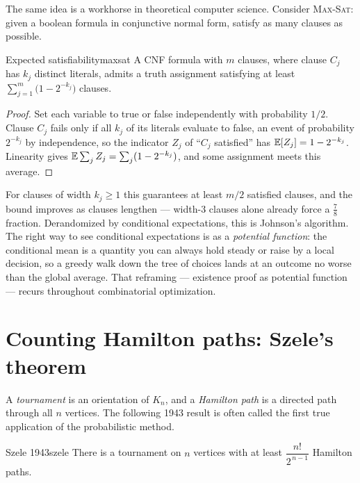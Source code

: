 The same idea is a workhorse in theoretical computer science. Consider
\textsc{Max-Sat}: given a boolean formula in conjunctive normal form, satisfy
as many clauses as possible.

\begin{theorem}{Expected satisfiability}{maxsat}
A CNF formula with $m$ clauses, where clause $C_j$ has $k_j$ distinct literals,
admits a truth assignment satisfying at least
$\displaystyle\sum_{j=1}^m\bigl(1-2^{-k_j}\bigr)$ clauses.
\end{theorem}

\begin{proof}
Set each variable to true or false independently with probability $1/2$. Clause
$C_j$ fails only if all $k_j$ of its literals evaluate to false, an event of
probability $2^{-k_j}$ by independence, so the indicator $Z_j$ of ``$C_j$
satisfied'' has $\mathbb{E}[Z_j]=1-2^{-k_j}$. Linearity gives
$\mathbb{E}\sum_j Z_j=\sum_j(1-2^{-k_j})$, and some assignment meets this average.
\end{proof}

\begin{insight}
For clauses of width $k_j\ge1$ this guarantees at least $m/2$ satisfied
clauses, and the bound improves as clauses lengthen --- width-$3$ clauses
alone already force a $\tfrac78$ fraction. Derandomized by conditional
expectations, this is Johnson's algorithm. The right way to see conditional
expectations is as a \emph{potential function}: the conditional mean is a
quantity you can always hold steady or raise by a local decision, so a greedy
walk down the tree of choices lands at an outcome no worse than the global
average. That reframing --- existence proof as potential function ---
recurs throughout combinatorial optimization.
\end{insight}

\section{Counting Hamilton paths: Szele's theorem}

A \emph{tournament} is an orientation of $K_n$, and a \emph{Hamilton path} is a
directed path through all $n$ vertices. The following 1943 result is often
called the first true application of the probabilistic method.

\begin{theorem}{Szele 1943}{szele}
There is a tournament on $n$ vertices with at least $\dfrac{n!}{2^{\,n-1}}$
Hamilton paths.
\end{theorem}

